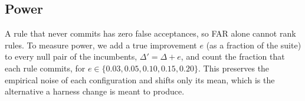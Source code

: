 \subsection{Power}\label{sec:power-method}
A rule that never commits has zero false acceptances, so FAR alone cannot rank
rules. To measure power, we add a true improvement $e$ (as a fraction of the
suite) to every null pair of the incumbents, $\Delta' = \Delta + e$, and count the
fraction that each rule commits, for $e \in \{0.03, 0.05, 0.10, 0.15, 0.20\}$.
This preserves the empirical noise of each configuration and shifts only its
mean, which is the alternative a harness change is meant to produce.
